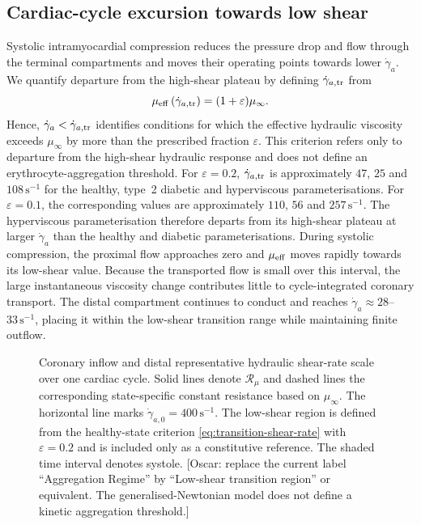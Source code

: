 \documentclass[lineno]{jfm}
\begin{document}
\subsection{Cardiac-cycle excursion towards low shear}
\label{sec:results-cycle-excursion}
Systolic intramyocardial compression reduces the pressure drop and flow through
the terminal compartments and moves their operating points towards lower
$\dot{\gamma}_a$.
We quantify departure from the high-shear plateau by defining
$\dot{\gamma}_{a,\rm tr}$ from
\begin{equation}
\mu_{\rm eff}
\left(
\dot{\gamma}_{a,\rm tr}
\right)
=
(1+\varepsilon)\mu_\infty.
\label{eq:transition-shear-rate}
\end{equation}
Hence,
$\dot{\gamma}_a<\dot{\gamma}_{a,\rm tr}$
identifies conditions for which the effective hydraulic viscosity exceeds
$\mu_\infty$ by more than the prescribed fraction $\varepsilon$. This
criterion refers only to departure from the high-shear hydraulic response and
does not define an erythrocyte-aggregation threshold.
For $\varepsilon=0.2$,
$\dot{\gamma}_{a,\rm tr}$ is approximately $47$, $25$ and
$108\,\mathrm{s}^{-1}$ for the healthy, type~2 diabetic and hyperviscous
parameterisations. For $\varepsilon=0.1$, the corresponding values are
approximately $110$, $56$ and $257\,\mathrm{s}^{-1}$. The hyperviscous
parameterisation therefore departs from its high-shear plateau at larger
$\dot{\gamma}_a$ than the healthy and diabetic parameterisations.
During systolic compression, the proximal flow approaches zero and
$\mu_{\rm eff}$ moves rapidly towards its low-shear value. Because the
transported flow is small over this interval, the large instantaneous
viscosity change contributes little to cycle-integrated coronary transport.
The distal compartment continues to conduct and reaches
$\dot{\gamma}_a\approx28$--$33\,\mathrm{s}^{-1}$, placing it within the
low-shear transition range while maintaining finite outflow.
\begin{figure}
    \centering
    \fbox{
    \rule{0pt}{0.29\textheight}
    \rule{0.92\textwidth}{0pt}
    }
    \caption{Coronary inflow and distal representative hydraulic shear-rate
    scale over one cardiac cycle. Solid lines denote $\mathcal{R}_{\mu}$ and
    dashed lines the corresponding state-specific constant resistance based on
    $\mu_\infty$. The horizontal line marks
    $\dot\gamma_{a,0}=400\,\mathrm{s}^{-1}$. The low-shear region is defined
    from the healthy-state criterion \eqref{eq:transition-shear-rate} with
    $\varepsilon=0.2$ and is included only as a constitutive reference. The
    shaded time interval denotes systole.
    {\color{red}[Oscar: replace the current label ``Aggregation Regime'' by
    ``Low-shear transition region'' or equivalent. The generalised-Newtonian
    model does not define a kinetic aggregation threshold.]}}
    \label{fig:cycle-flow-shear}
\end{figure}
\end{document}
